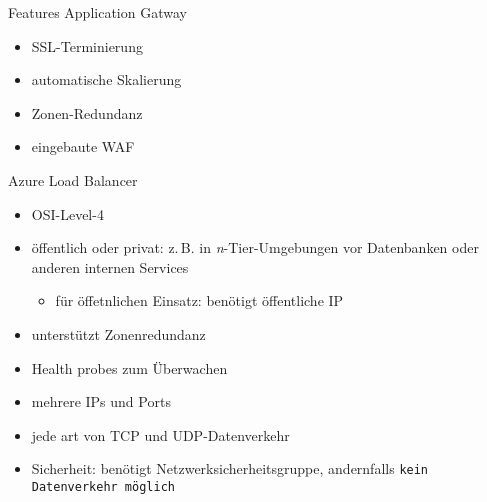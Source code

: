 \begin{flashcard}[]{Features Application Gatway}
  \begin{itemize}
    \item SSL-Terminierung
    \item automatische Skalierung
    \item Zonen-Redundanz
    \item eingebaute WAF
  \end{itemize}
\end{flashcard}

\begin{flashcard}[]{Azure Load Balancer}
  \begin{itemize}
    \item OSI-Level-4
    \item öffentlich oder privat: z.\,B. in \textit{n}-Tier-Umgebungen\newline
      vor Datenbanken oder anderen internen Services
      \begin{itemize}
        \item für öffetnlichen Einsatz: benötigt öffentliche IP
      \end{itemize}
    \item unterstützt Zonenredundanz
    \item Health probes zum Überwachen
    \item mehrere IPs und Ports
    \item jede art von TCP und UDP-Datenverkehr
    \item Sicherheit: benötigt Netzwerksicherheitsgruppe, andernfalls\newline
      \texttt{kein Datenverkehr möglich}
  \end{itemize}
\end{flashcard}
